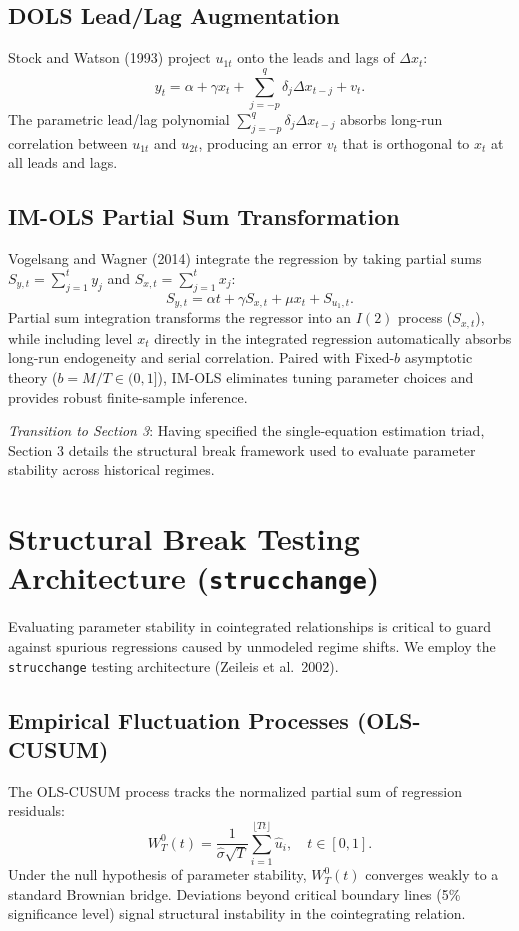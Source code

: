 \documentclass[11pt,a4paper]{article}
\begin{document}
\subsection{DOLS Lead/Lag Augmentation}
Stock and Watson (1993) project $u_{1t}$ onto the leads and lags of $\Delta x_t$:
\begin{equation}
y_t = \alpha + \gamma x_t + \sum_{j=-p}^q \delta_j \Delta x_{t-j} + v_t.
\end{equation}
The parametric lead/lag polynomial $\sum_{j=-p}^q \delta_j \Delta x_{t-j}$ absorbs long-run correlation between $u_{1t}$ and $u_{2t}$, producing an error $v_t$ that is orthogonal to $x_t$ at all leads and lags.

\subsection{IM-OLS Partial Sum Transformation}
Vogelsang and Wagner (2014) integrate the regression by taking partial sums $S_{y,t} = \sum_{j=1}^t y_j$ and $S_{x,t} = \sum_{j=1}^t x_j$:
\begin{equation}
S_{y,t} = \alpha t + \gamma S_{x,t} + \mu x_t + S_{u_1,t}.
\end{equation}
Partial sum integration transforms the regressor into an $I(2)$ process ($S_{x,t}$), while including level $x_t$ directly in the integrated regression automatically absorbs long-run endogeneity and serial correlation. Paired with Fixed-$b$ asymptotic theory ($b = M/T \in (0, 1]$), IM-OLS eliminates tuning parameter choices and provides robust finite-sample inference.

\textit{Transition to Section 3}: Having specified the single-equation estimation triad, Section 3 details the structural break framework used to evaluate parameter stability across historical regimes.

\FloatBarrier
\section{Structural Break Testing Architecture (\texttt{strucchange})}

Evaluating parameter stability in cointegrated relationships is critical to guard against spurious regressions caused by unmodeled regime shifts. We employ the \texttt{strucchange} testing architecture (Zeileis et al.\ 2002).

\subsection{Empirical Fluctuation Processes (OLS-CUSUM)}
The OLS-CUSUM process tracks the normalized partial sum of regression residuals:
\begin{equation}
W_T^0(t) = \frac{1}{\hat{\sigma} \sqrt{T}} \sum_{i=1}^{\lfloor Tt \rfloor} \hat{u}_i, \quad t \in [0, 1].
\end{equation}
Under the null hypothesis of parameter stability, $W_T^0(t)$ converges weakly to a standard Brownian bridge. Deviations beyond critical boundary lines (5\% significance level) signal structural instability in the cointegrating relation.
\end{document}
